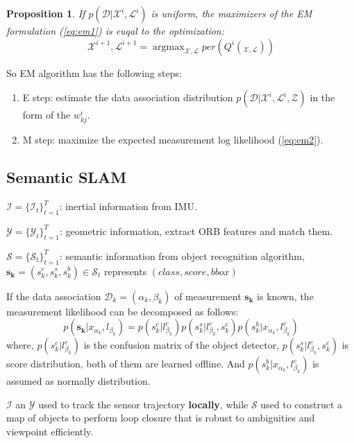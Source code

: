 \documentclass[12pt]{article}
\DeclareMathOperator*{\argmax}{argmax} %
\numberwithin{equation}{section}
\newtheorem{Proposition}{Proposition}
\begin{document}
\begin{Proposition}
	If $p(\mathcal{D}|\mathcal{X}^i,\mathcal{L}^i)$ is uniform, the maximizers of the EM formulation (\ref{eq:em1}) is euqal to the optimization:
	\begin{equation}
		\mathcal{X}^{i+1}, \mathcal{L}^{i+1} = \argmax_{\mathcal{X},\mathcal{L}} per(Q^i(_{\mathcal{X},\mathcal{L}}))
	\end{equation}
\end{Proposition} \par
So EM algorithm has the following steps:
\begin{enumerate}
	\item E step: estimate the data association distribution $p(\mathcal{D}|\mathcal{X}^i,\mathcal{L}^i,\mathcal{Z})$ in the form of the $w^i_{kj}$.
	\item M step: maximize the expected measurement log likelihood (\ref{eq:em2}).
\end{enumerate}
\subsection{Semantic SLAM}
$\mathcal{I}=\{\mathcal{I}_t\}^T_{t=1}$: inertial information from IMU. \par
$\mathcal{Y}=\{\mathcal{Y}_t\}^T_{t=1}$: geometric information, extract ORB features and match them. \par
$\mathcal{S}=\{\mathcal{S}_t\}^T_{t=1}$: semantic information  from object recognition algorithm, $\bm{s_k}=(s^c_k, s^s_k, s^b_k) \in \mathcal{S}_t$ represents $(class, score, bbox)$ \par
If the data association $\mathcal{D}_k=(\alpha_k, \beta_k)$ of measurement $\bm{s_k}$ is known, the measurement likelihood can be decomposed as follows:
\begin{equation}
	p(\bm{s_k}|x_{\alpha_k}, l_{\beta_k})=p(s^c_k|l^c_{\beta_k}) p(s^s_k|l^c_{\beta_k},s^c_k) p(s^b_k|x_{\alpha_k},l^c_{\beta_k})
\end{equation}
where, $p(s^c_k|l^c_{\beta_k})$ is the confusion matrix of the object detector, $p(s^s_k|l^c_{\beta_k},s^c_k)$ is score distribution, both of them are learned offline. And $p(s^b_k|x_{\alpha_k},l^c_{\beta_k})$ is assumed as normally distribution. \par
$\mathcal{I}$ an $\mathcal{Y}$ used to track the sensor trajectory \textbf{locally}, while $\mathcal{S}$ used to construct a map of objects to perform loop closure that is robust to ambiguities and viewpoint efficiently. \par
\end{document}
